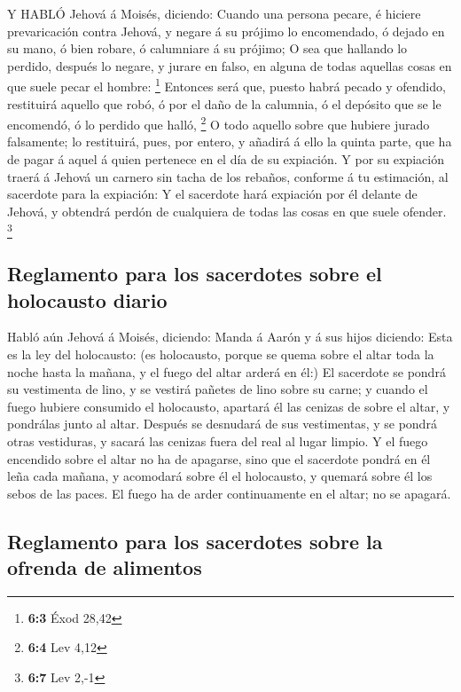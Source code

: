  Y HABLÓ Jehová á Moisés, diciendo:  Cuando una
persona pecare, é hiciere prevaricación contra Jehová, y negare á su
prójimo lo encomendado, ó dejado en su mano, ó bien robare, ó calumniare
á su prójimo;  O sea que hallando lo perdido, después lo
negare, y jurare en falso, en alguna de todas aquellas cosas en que
suele pecar el hombre: \footnote{\textbf{6:3} Éxod 28,42} 
Entonces será que, puesto habrá pecado y ofendido, restituirá aquello
que robó, ó por el daño de la calumnia, ó el depósito que se le
encomendó, ó lo perdido que halló, \footnote{\textbf{6:4} Lev 4,12}
 O todo aquello sobre que hubiere jurado falsamente; lo
restituirá, pues, por entero, y añadirá á ello la quinta parte, que ha
de pagar á aquel á quien pertenece en el día de su expiación.
 Y por su expiación traerá á Jehová un carnero sin tacha de
los rebaños, conforme á tu estimación, al sacerdote para la expiación:
 Y el sacerdote hará expiación por él delante de Jehová, y
obtendrá perdón de cualquiera de todas las cosas en que suele ofender.
\footnote{\textbf{6:7} Lev 2,-1}

\hypertarget{reglamento-para-los-sacerdotes-sobre-el-holocausto-diario}{%
\subsection{Reglamento para los sacerdotes sobre el holocausto
diario}\label{reglamento-para-los-sacerdotes-sobre-el-holocausto-diario}}

 Habló aún Jehová á Moisés, diciendo:  Manda á
Aarón y á sus hijos diciendo: Esta es la ley del holocausto: (es
holocausto, porque se quema sobre el altar toda la noche hasta la
mañana, y el fuego del altar arderá en él:)  El sacerdote
se pondrá su vestimenta de lino, y se vestirá pañetes de lino sobre su
carne; y cuando el fuego hubiere consumido el holocausto, apartará él
las cenizas de sobre el altar, y pondrálas junto al altar. 
Después se desnudará de sus vestimentas, y se pondrá otras vestiduras, y
sacará las cenizas fuera del real al lugar limpio.  Y el
fuego encendido sobre el altar no ha de apagarse, sino que el sacerdote
pondrá en él leña cada mañana, y acomodará sobre él el holocausto, y
quemará sobre él los sebos de las paces.  El fuego ha de
arder continuamente en el altar; no se apagará.

\hypertarget{reglamento-para-los-sacerdotes-sobre-la-ofrenda-de-alimentos}{%
\subsection{Reglamento para los sacerdotes sobre la ofrenda de
alimentos}\label{reglamento-para-los-sacerdotes-sobre-la-ofrenda-de-alimentos}}

